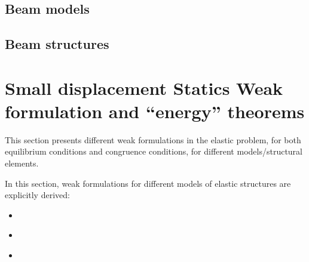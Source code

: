 \documentclass[letterpaper,10pt,english]{jupyterBook}
\begin{document}
\section{Beam models}
\label{\detokenize{ch/solids/small-displacements-statics:beam-models}}\label{\detokenize{ch/solids/small-displacements-statics:solid-mechanics-intro-small-displacements-statics-beam}}

\section{Beam structures}
\label{\detokenize{ch/solids/small-displacements-statics:beam-structures}}\label{\detokenize{ch/solids/small-displacements-statics:solid-mechanics-intro-small-displacements-statics-beam-structures}}
\sphinxstepscope


\chapter{Small displacement \sphinxhyphen{} Statics \sphinxhyphen{} Weak formulation and “energy” theorems}
\label{\detokenize{ch/solids/small-displacements-statics-weak-form:small-displacement-statics-weak-formulation-and-energy-theorems}}\label{\detokenize{ch/solids/small-displacements-statics-weak-form:solid-mechanics-intro-small-displacements-statics-weak-form}}\label{\detokenize{ch/solids/small-displacements-statics-weak-form::doc}}
\sphinxAtStartPar
This section presents different weak formulations in the elastic problem, for both equilibrium conditions and congruence conditions, for different models/structural elements.

\sphinxAtStartPar
{} In this section, weak formulations for different models of elastic structures are explicitly derived:
\begin{itemize}
\item {} 
\sphinxAtStartPar
{\hyperref[\detokenize{ch/solids/small-displacements-statics-weak-form-3d:solid-mechanics-intro-small-displacements-statics-weak-form-3d}]{}}

\item {} 
\sphinxAtStartPar
{\hyperref[\detokenize{ch/solids/small-displacements-statics-beams-weak-form-general:solid-mechanics-intro-small-displacements-statics-beam-weak-form-general}]{}}

\item {} 
\sphinxAtStartPar
{\hyperref[\detokenize{ch/solids/small-displacements-statics-beams-weak-form:solid-mechanics-intro-small-displacements-statics-beam-weak-form}]{}}

\end{itemize}
\end{document}

